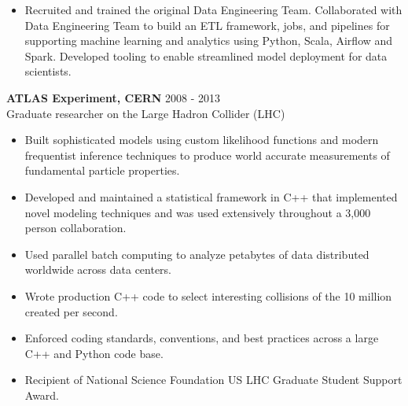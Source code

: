 \documentclass[9pt]{article}
\newenvironment{changemargin}[2]{%
  \begin{list}{}{%
    \setlength{\topsep}{0pt}%
    \setlength{\leftmargin}{#1}%
    \setlength{\rightmargin}{#2}%
    \setlength{\listparindent}{\parindent}%
    \setlength{\itemindent}{\parindent}%
    \setlength{\parsep}{\parskip}%
  }%
  \item[]}{\end{list}
}
\newenvironment{body} {
  \vspace*{-16pt}
\begin{changemargin}{-0.25in}{-0.5in}
  }
{\end{changemargin}
}
\begin{document}
\begin{body}
\begin{itemize}
    \item Recruited and trained the original Data Engineering Team.  Collaborated with Data Engineering Team to build an ETL framework, jobs, and pipelines for supporting machine learning and analytics using Python, Scala, Airflow and Spark.  Developed tooling to enable streamlined model deployment for data scientists. \\
  \end{itemize}

        \medskip

        \textbf{ATLAS Experiment, CERN} \hfill 2008 - 2013\\
        Graduate researcher on the Large Hadron Collider (LHC) \\
        \medskip

        \begin{itemize}

        \item Built sophisticated models using custom likelihood functions and modern frequentist inference techniques to produce world accurate measurements of fundamental particle properties.

        \item Developed and maintained a statistical framework in C++ that implemented novel modeling techniques and was used extensively throughout a 3,000 person collaboration.

        \item Used parallel batch computing to analyze petabytes of data distributed worldwide across data centers.

        \item Wrote production C++ code to select interesting collisions of the 10 million created per second.

        \item Enforced coding standards, conventions, and best practices across a large C++ and Python code base.

        \item Recipient of National Science Foundation US LHC Graduate Student Support Award.

        \end{itemize}

\end{body}
\end{document}
